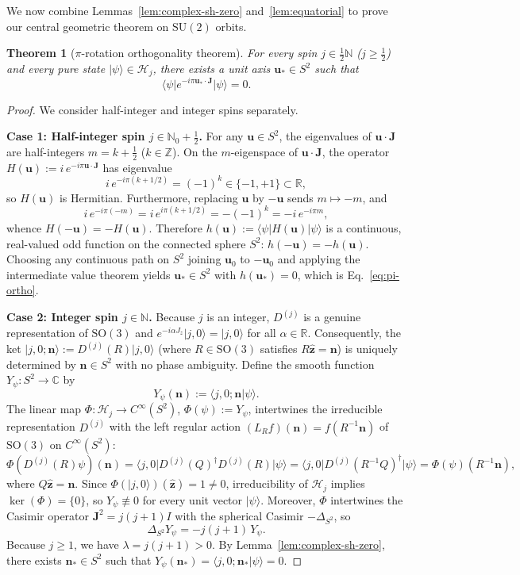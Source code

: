 \documentclass[11pt,a4paper]{article}
\newtheorem{theorem}{Theorem}
\theoremstyle{remark}
\newcommand{\ket}[1]{\lvert #1 \rangle}
\newcommand{\bra}[1]{\langle #1 \rvert}
\newcommand{\braket}[2]{\langle #1 \vert #2 \rangle}
\newcommand{\LapS}{\Delta_{S^2}}
\newcommand{\bn}{\mathbf{n}}
\newcommand{\bu}{\mathbf{u}}
\newcommand{\bJ}{\mathbf{J}}
\begin{document}
We now combine Lemmas~\ref{lem:complex-sh-zero} and~\ref{lem:equatorial} to prove our central geometric theorem on $\mathrm{SU}(2)$ orbits.

\begin{theorem}[$\pi$-rotation orthogonality theorem]\label{thm:pi-ortho}
For every spin $j \in \frac{1}{2}\mathbb{N}$ ($j \ge \frac{1}{2}$) and every pure state $\ket{\psi} \in \mathcal{H}_j$, there exists a unit axis $\bu_* \in S^2$ such that
\begin{equation}\label{eq:pi-ortho}
\bra{\psi} e^{-i\pi \bu_* \cdot \bJ} \ket{\psi} = 0.
\end{equation}
\end{theorem}

\begin{proof}
We consider half-integer and integer spins separately.

\medskip
\noindent\textbf{Case 1: Half-integer spin $j \in \mathbb{N}_0 + \frac{1}{2}$.}
For any $\bu \in S^2$, the eigenvalues of $\bu\cdot\bJ$ are half-integers $m = k + \frac{1}{2}$ ($k \in \mathbb{Z}$). On the $m$-eigenspace of $\bu\cdot\bJ$, the operator $H(\bu) := i\,e^{-i\pi \bu\cdot\bJ}$ has eigenvalue
\[
i\,e^{-i\pi(k + 1/2)} = (-1)^k \in \{-1, +1\} \subset \mathbb{R},
\]
so $H(\bu)$ is Hermitian. Furthermore, replacing $\bu$ by $-\bu$ sends $m \mapsto -m$, and
\[
i\,e^{-i\pi(-m)} = i\,e^{i\pi(k + 1/2)} = -(-1)^k = -i\,e^{-i\pi m},
\]
whence $H(-\bu) = -H(\bu)$. Therefore $h(\bu) := \bra{\psi} H(\bu) \ket{\psi}$ is a continuous, real-valued odd function on the connected sphere $S^2$: $h(-\bu) = -h(\bu)$. Choosing any continuous path on $S^2$ joining $\bu_0$ to $-\bu_0$ and applying the intermediate value theorem yields $\bu_* \in S^2$ with $h(\bu_*) = 0$, which is Eq.~\eqref{eq:pi-ortho}.

\medskip
\noindent\textbf{Case 2: Integer spin $j \in \mathbb{N}$.}
Because $j$ is an integer, $D^{(j)}$ is a genuine representation of $\mathrm{SO}(3)$ and $e^{-i\alpha J_z}\ket{j,0} = \ket{j,0}$ for all $\alpha \in \mathbb{R}$. Consequently, the ket $\ket{j,0;\bn} := D^{(j)}(R)\ket{j,0}$ (where $R \in \mathrm{SO}(3)$ satisfies $R\hat{\mathbf{z}} = \bn$) is uniquely determined by $\bn \in S^2$ with no phase ambiguity. Define the smooth function $Y_\psi : S^2 \to \mathbb{C}$ by
\[
Y_\psi(\bn) := \braket{j,0;\bn}{\psi}.
\]
The linear map $\Phi : \mathcal{H}_j \to C^\infty(S^2)$, $\Phi(\psi) := Y_\psi$, intertwines the irreducible representation $D^{(j)}$ with the left regular action $(L_R f)(\bn) = f(R^{-1}\bn)$ of $\mathrm{SO}(3)$ on $C^\infty(S^2)$:
\[
\Phi(D^{(j)}(R)\psi)(\bn) = \bra{j,0} D^{(j)}(Q)^\dagger D^{(j)}(R)\ket{\psi}
= \bra{j,0} D^{(j)}(R^{-1}Q)^\dagger \ket{\psi} = \Phi(\psi)(R^{-1}\bn),
\]
where $Q\hat{\mathbf{z}} = \bn$. Since $\Phi(\ket{j,0})(\hat{\mathbf{z}}) = 1 \neq 0$, irreducibility of $\mathcal{H}_j$ implies $\ker(\Phi) = \{0\}$, so $Y_\psi \not\equiv 0$ for every unit vector $\ket{\psi}$. Moreover, $\Phi$ intertwines the Casimir operator $\bJ^2 = j(j+1)I$ with the spherical Casimir $-\LapS$, so
\[
\LapS Y_\psi = -j(j+1)\,Y_\psi.
\]
Because $j \ge 1$, we have $\lambda = j(j+1) > 0$. By Lemma~\ref{lem:complex-sh-zero}, there exists $\bn_* \in S^2$ such that $Y_\psi(\bn_*) = \braket{j,0;\bn_*}{\psi} = 0$.


\end{proof}
\end{document}
